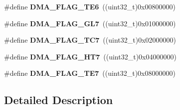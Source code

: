 \begin{DoxyCompactItemize}
\item 
\hypertarget{group___d_m_a__flag__definitions_ga50e2f489b50cbe42d03a80ca7cd42dad}{\#define {\bfseries D\-M\-A\-\_\-\-F\-L\-A\-G\-\_\-\-T\-E6}~((uint32\-\_\-t)0x00800000)}\label{group___d_m_a__flag__definitions_ga50e2f489b50cbe42d03a80ca7cd42dad}

\item 
\hypertarget{group___d_m_a__flag__definitions_gaf4619624c5d2cde7fc58bc4cd400bfc3}{\#define {\bfseries D\-M\-A\-\_\-\-F\-L\-A\-G\-\_\-\-G\-L7}~((uint32\-\_\-t)0x01000000)}\label{group___d_m_a__flag__definitions_gaf4619624c5d2cde7fc58bc4cd400bfc3}

\item 
\hypertarget{group___d_m_a__flag__definitions_gaacfd9fe9de9727dd862aa475b3d5aee8}{\#define {\bfseries D\-M\-A\-\_\-\-F\-L\-A\-G\-\_\-\-T\-C7}~((uint32\-\_\-t)0x02000000)}\label{group___d_m_a__flag__definitions_gaacfd9fe9de9727dd862aa475b3d5aee8}

\item 
\hypertarget{group___d_m_a__flag__definitions_ga8216565e4c640761fa93891006d43655}{\#define {\bfseries D\-M\-A\-\_\-\-F\-L\-A\-G\-\_\-\-H\-T7}~((uint32\-\_\-t)0x04000000)}\label{group___d_m_a__flag__definitions_ga8216565e4c640761fa93891006d43655}

\item 
\hypertarget{group___d_m_a__flag__definitions_ga312e060067bffdf46136be4f7b0b614c}{\#define {\bfseries D\-M\-A\-\_\-\-F\-L\-A\-G\-\_\-\-T\-E7}~((uint32\-\_\-t)0x08000000)}\label{group___d_m_a__flag__definitions_ga312e060067bffdf46136be4f7b0b614c}

\end{DoxyCompactItemize}


\subsection{Detailed Description}
